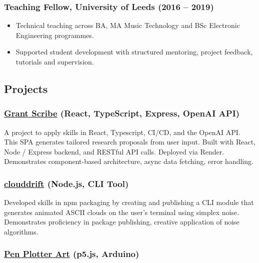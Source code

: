 \documentclass[10pt,a4paper]{article}
\providecommand{\tightlist}{%
  \setlength{\itemsep}{0pt}\setlength{\parskip}{0pt}}
\begin{document}
\subsubsection{Teaching Fellow, University of Leeds (2016 --
2019)}\label{teaching-fellow-university-of-leeds-2016-2019}

\begin{itemize}
\tightlist
\item
  Technical teaching across BA, MA Music Technology and BSc Electronic
  Engineering programmes.
\item
  Supported student development with structured mentoring, project
  feedback, tutorials and supervision.
\end{itemize}

\subsection{Projects}\label{projects}

\subsubsection{\texorpdfstring{\href{https://granter.onrender.com/}{Grant
Scribe} (React, TypeScript, Express, OpenAI
API)}{Grant Scribe (React, TypeScript, Express, OpenAI API)}}\label{grant-scribe-react-typescript-express-openai-api}

A project to apply skills in React, Typescript, CI/CD, and the OpenAI
API. This SPA generates tailored research proposals from user input.
Built with React, Node / Express backend, and RESTful API calls.
Deployed via Render. Demonstrates component-based architecture, async
data fetching, error handling.

\subsubsection{\texorpdfstring{\href{https://github.com/thrly/clouddrift}{clouddrift}
(Node.js, CLI
Tool)}{clouddrift (Node.js, CLI Tool)}}\label{clouddrift-node.js-cli-tool}

Developed skills in npm packaging by creating and publishing a CLI
module that generates animated ASCII clouds on the user's terminal using
simplex noise. Demonstrates proficiency in package publishing, creative
application of noise algorithms.

\subsubsection{\texorpdfstring{\href{https://github.com/thrly/pen-plotter-resources}{Pen
Plotter Art} (p5.js,
Arduino)}{Pen Plotter Art (p5.js, Arduino)}}\label{pen-plotter-art-p5.js-arduino}
\end{document}
